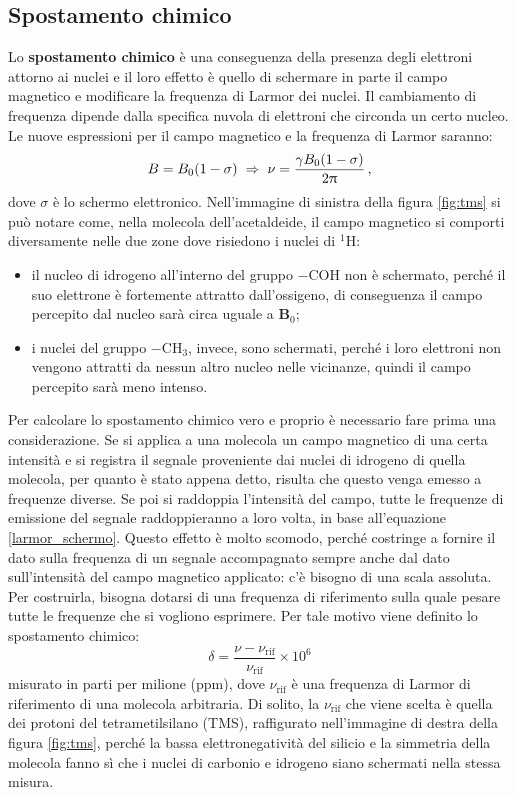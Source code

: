 \documentclass{report}
\newcommand{\figref}[1]{figura \ref{#1}}
\renewcommand{\eqref}[1]{equazione \ref{#1}}
\numberwithin{equation}{section}
\numberwithin{figure}{section}
\renewcommand{\Vec}{\bm}
\begin{document}
\subsection{Spostamento chimico}
Lo \textbf{spostamento chimico} è una conseguenza della presenza degli elettroni attorno ai nuclei e il loro effetto è quello di schermare in parte il campo magnetico e modificare la frequenza di Larmor dei nuclei. Il cambiamento di frequenza dipende dalla specifica nuvola di elettroni che circonda un certo nucleo. Le nuove espressioni per il campo magnetico e la frequenza di Larmor saranno:
\begin{equation}
    B = B_0(1-\sigma)  \hspace{3 pt} \Rightarrow \hspace{3 pt} \nu=\frac{\gamma B_0(1-\sigma)}{2\uppi}\,,
    \label{larmor_schermo}
\end{equation}
dove $\sigma$ è lo schermo elettronico. Nell'immagine di sinistra della \figref{fig:tms} si può notare come, nella molecola dell'acetaldeide, il campo magnetico si comporti diversamente nelle due zone dove risiedono i nuclei di $\mathrm{^1H}$:
\begin{itemize}[label=$-$]
    \item il nucleo di idrogeno all'interno del gruppo $-$COH non è schermato, perché il suo elettrone è fortemente attratto dall'ossigeno, di conseguenza il campo percepito dal nucleo sarà circa uguale a $\Vec{B}_0$;
    \item i nuclei del gruppo $-\mathrm{CH_3}$, invece, sono schermati, perché i loro elettroni non vengono attratti da nessun altro nucleo nelle vicinanze, quindi il campo percepito sarà meno intenso.
\end{itemize}

Per calcolare lo spostamento chimico vero e proprio è necessario fare prima una considerazione. Se si applica a una molecola un campo magnetico di una certa intensità e si registra il segnale proveniente dai nuclei di idrogeno di quella molecola, per quanto è stato appena detto, risulta che questo venga emesso a frequenze diverse. Se poi si raddoppia l'intensità del campo, tutte le frequenze di emissione del segnale raddoppieranno a loro volta, in base all'\eqref{larmor_schermo}. Questo effetto è molto scomodo, perché costringe a fornire il dato sulla frequenza di un segnale accompagnato sempre anche dal dato sull'intensità del campo magnetico applicato: c'è bisogno di una scala assoluta. Per costruirla, bisogna dotarsi di una frequenza di riferimento sulla quale pesare tutte le frequenze che si vogliono esprimere. Per tale motivo viene definito lo spostamento chimico:
\begin{equation}
    \boxed{\delta = \dfrac{\nu - \nu_{\mathrm{rif}}}{\nu_{\mathrm{rif}}} \times 10^6}
\end{equation}
misurato in parti per milione (ppm), dove $\nu_{\mathrm{rif}}$ è una frequenza di Larmor di riferimento di una molecola arbitraria. Di solito, la $\nu_{\mathrm{rif}}$ che viene scelta è quella dei protoni del tetrametilsilano (TMS), raffigurato nell'immagine di destra della \figref{fig:tms}, perché la bassa elettronegatività del silicio e la simmetria della molecola fanno sì che i nuclei di carbonio e idrogeno siano schermati nella stessa misura.
\end{document}
